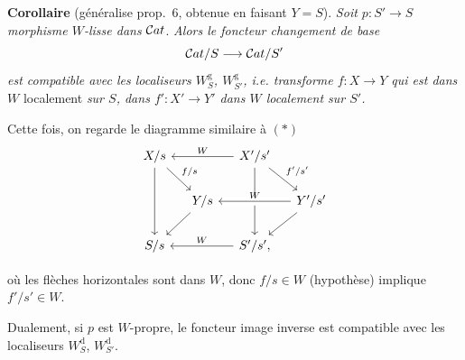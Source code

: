 \textbf{Corollaire} (généralise prop.~6, obtenue en faisant $Y=S$). \textit{Soit $p : S'\longrightarrow S$} \textit{morphisme $W$-lisse dans} $\mathcal{C}at$. \textit{Alors le foncteur changement de base}
\[
\mathcal{C}at/S\longrightarrow\mathcal{C}at/S'
\]
\textit{est compatible avec les localiseurs $W^{\mathrm{g}}_S$, $W^{\mathrm{g}}_{S'}$, i.e. transforme $f : X\longrightarrow Y$ qui est dans $W$} localement \textit{sur $S$, dans $f' : X'\longrightarrow Y'$ dans $W$ localement sur $S'$.}

Cette fois, on regarde le diagramme similaire à $(*)$
\[
\begin{tikzcd}[column sep=small]
X/s \arrow[dd] \arrow[dr, "f/s"] & & X'/s' \arrow[ll, "W"'] \arrow[dd] \arrow[dr, "f'/s'"] & \\
& Y/s \arrow[dl] & & Y'/s' \arrow[ll, "W"', crossing over] \arrow[dl] \\
S/s & & S'/s', \arrow[ll, "W"'] &
\end{tikzcd}
\]

où les flèches horizontales sont dans $W$, donc $f/s\in W$ (hypothèse) implique $f'/s'\in W$.

\leavevmode{}Dualement, si $p$ est $W$-propre, le foncteur image inverse est compatible avec les localiseurs $W^{\mathrm{d}}_S$, $W^{\mathrm{d}}_{S'}$.


